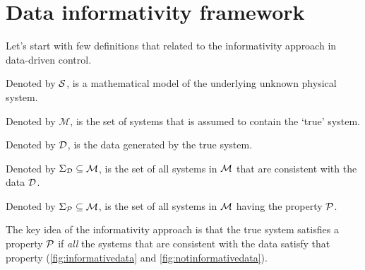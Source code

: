 \section{Data informativity framework} \label{sec:prob}
Let's start with few definitions that related to the informativity approach in data-driven control.
\begin{definition}
Denoted by $\mathcal{S}$, is a mathematical model of the underlying unknown physical system.
\end{definition}
\begin{definition}
Denoted by $\mathcal{M}$, is the set of systems that is assumed to contain the `true' system.
\end{definition}
\begin{definition}
Denoted by $\mathcal{D}$, is the data generated by the true system.
\end{definition}
\begin{definition}
Denoted by $\Sigma_{\mathcal{D}}\subseteq\mathcal{M}$, is the set of all systems in $\mathcal{M}$ that are consistent with the data $\mathcal{D}$.
\end{definition}
\begin{definition}
Denoted by $\Sigma_{\mathcal{P}}\subseteq\mathcal{M}$, is the set of all systems in $\mathcal{M}$ having the property $\mathcal{P}$.
\end{definition}
The key idea of the informativity approach is that the true system satisfies a property $\mathcal{P}$ if \emph{all} the systems that are consistent with the data satisfy that property (\ref{fig:informativedata} and \ref{fig:notinformativedata}).
